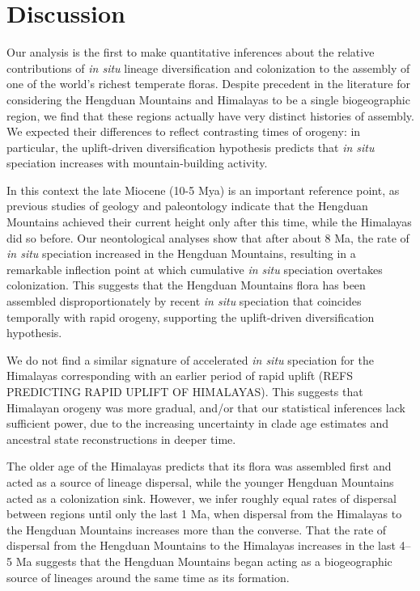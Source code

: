 \section{Discussion}

Our analysis is the first to make quantitative inferences about the relative contributions of \textit{in situ} lineage diversification and colonization to the assembly of one of the world's richest temperate floras. Despite precedent in the literature for considering the Hengduan Mountains and Himalayas to be a single biogeographic region, we find that these regions actually have very distinct histories of assembly. We expected their differences to reflect contrasting times of orogeny: in particular, the uplift-driven diversification hypothesis predicts that \textit{in situ} speciation increases with mountain-building activity.

In this context the late Miocene (10-5 Mya) is an important reference point, as previous studies of geology and paleontology indicate that the Hengduan Mountains achieved their current height only after this time, while the Himalayas did so before. Our neontological analyses show that after about 8 Ma, the rate of \textit{in situ} speciation increased in the Hengduan Mountains, resulting in a remarkable inflection point at which cumulative \textit{in situ} speciation overtakes colonization. This suggests that the Hengduan Mountains flora has been assembled disproportionately by recent \textit{in situ} speciation that coincides temporally with rapid orogeny, supporting the uplift-driven diversification hypothesis.

We do not find a similar signature of accelerated \textit{in situ} speciation for the Himalayas corresponding with an earlier period of rapid uplift (REFS PREDICTING RAPID UPLIFT OF HIMALAYAS). This suggests that Himalayan orogeny was more gradual, and/or that our statistical inferences lack sufficient power, due to the increasing uncertainty in clade age estimates and ancestral state reconstructions in deeper time.

The older age of the Himalayas predicts that its flora was assembled first and acted as a source of lineage dispersal, while the younger Hengduan Mountains acted as a colonization sink. However, we infer roughly equal rates of dispersal between regions until only the last 1 Ma, when dispersal from the Himalayas to the Hengduan Mountains increases more than the converse. That the rate of dispersal from the Hengduan Mountains to the Himalayas increases in the last 4--5 Ma suggests that the Hengduan Mountains began acting as a biogeographic source of lineages around the same time as its formation.%

